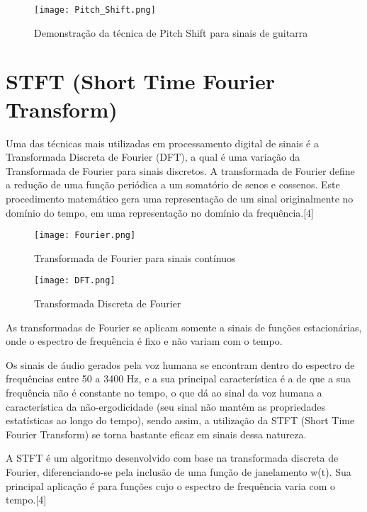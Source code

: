 \begin{figure}[h]
	\centering
	\texttt{[image: Pitch\_Shift.png]}
	\label{fig:Pitch_Shif}
	\caption{Demonstração da técnica de Pitch Shift para sinais de guitarra}
\end{figure}
\newpage

\section*{STFT (Short Time Fourier Transform)}\label{sec:est_obs}
Uma das técnicas mais utilizadas em processamento digital de sinais é a Transformada Discreta de Fourier (DFT), a qual é uma variação da Transformada de Fourier para sinais discretos. A transformada de Fourier define a redução de uma função periódica a um somatório de senos e cossenos. Este procedimento matemático gera uma representação de um sinal originalmente no domínio do tempo, em uma representação no domínio da frequência.[4]

\begin{figure}[h]
	\centering
	\texttt{[image: Fourier.png]}
	\label{fig:Fourier}
	\caption{Transformada de Fourier para sinais contínuos}
\end{figure}

\begin{figure}[h]
	\centering
	\texttt{[image: DFT.png]}
	\label{fig:DFT}
	\caption{Transformada Discreta de Fourier}
\end{figure}

As transformadas de Fourier se aplicam somente a sinais de funções estacionárias, onde o espectro de frequência é fixo e não variam com o tempo.

Os sinais de áudio gerados pela voz humana se encontram dentro do espectro de frequências entre 50 a 3400 Hz, e a sua principal característica é a de que a sua frequência não é constante no tempo, o que dá ao sinal da voz humana a característica da não-ergodicidade (seu sinal não mantém as propriedades estatísticas ao longo do tempo), sendo assim, a utilização da STFT (Short Time Fourier Transform) se torna bastante eficaz em sinais dessa natureza.

A STFT é um algoritmo desenvolvido com base na transformada discreta de Fourier, diferenciando-se pela inclusão de uma função de janelamento w(t). Sua principal aplicação é para funções cujo o espectro de frequência varia com o tempo.[4]

